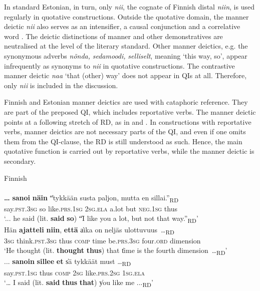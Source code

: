 \documentclass[output=paper,colorlinks,citecolor=brown]{langscibook}
\begin{document}
In standard Estonian, in turn, only \textit{nii}, the cognate of Finnish distal \textit{niin}, is used regularly in quotative constructions. Outside the quotative domain, the manner deictic \textit{nii} also serves as an intensifier, a causal conjunction and a correlative word \citep[109]{Keevallik2005}. The deictic distinctions of manner and other demonstratives are neutralised at the level of the literary standard. Other manner deictics, e.g. the synonymous adverbs \textit{nõnda,} \textit{sedamoodi,} \textit{selliselt}, meaning ‘this way, so’, appear infrequently as synonyms to \textit{nii} in quotative constructions. The contrastive manner deictic \textit{naa} ‘that (other) way’ does not appear in QIs at all. Therefore, only \textit{nii} is included in the discussion.

Finnish and Estonian manner deictics are used with cataphoric reference. They are part of the preposed QI, which includes reportative verbs. The manner deictic points at a following stretch of RD, as in  and . In constructions with reportative verbs, manner deictics are not necessary parts of the QI, and even if one omits them from the QI-clause, the RD is still understood as such. Hence, the main quotative function is carried out by reportative verbs, while the manner deictic is secondary.

\ea\label{ex:teptiuk:4} {Finnish}\\
\\
\gll \textbf{…} \textbf{sanoi} \textbf{näin} \|“tykkään susta  paljon, mutta en sillai.”\|\textsubscript{RD}\\
{} say.\textsc{pst.3sg} so\footnotemark{} {\db}{\db}like.\textsc{prs.1sg} \textsc{2sg.ela} a.lot but \textsc{neg.1sg} thus\\
\glt ‘... he said (lit. \textbf{said} \textbf{so}) \|“I like you a lot, but not that way.”\|\textsubscript{RD}’
\\
\gll Hän \textbf{ajatteli} \textbf{niin}, \textbf{että} \|aika on neljäs 
ulottuvuus~…\|\textsubscript{RD}\\
 \textsc{3sg} think.\textsc{pst.3sg} thus \textsc{comp} {\db}time be.\textsc{prs.3sg} four.\textsc{ord} dimension\\
\glt ‘He thought (lit. \textbf{thought} \textbf{thus}) that \|time is the fourth dimension~…\|\textsubscript{RD}’
\\
\gll ... \textbf{sanoin} \textbf{sillee} \textbf{et} \|sä tykkäät must …\|\textsubscript{RD}\\
 {} say.\textsc{pst}.1\textsc{sg} thus \textsc{comp} {\db}2\textsc{sg} like.\textsc{prs.2sg} 1\textsc{sg}.\textsc{ela}\\
\glt ‘… I said (lit. \textbf{said} \textbf{thus} \textbf{that}) \|you like me ...\|\textsubscript{RD}’
\z
\z
\end{document}
